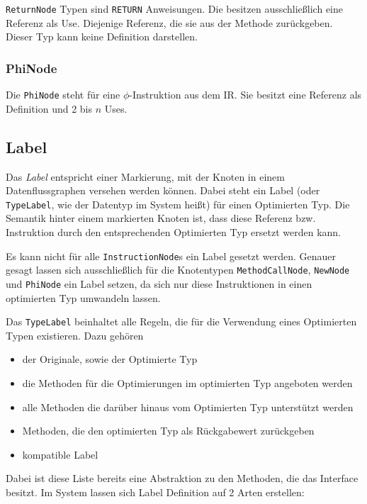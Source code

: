 \texttt{ReturnNode} Typen sind \texttt{RETURN} Anweisungen. Die besitzen 
ausschließlich eine Referenz als Use. Diejenige Referenz, die sie aus der Methode 
zurückgeben. Dieser Typ kann keine Definition darstellen.

\subsubsection{PhiNode}

Die \texttt{PhiNode} steht für eine $\phi$-Instruktion aus dem IR. Sie besitzt eine
Referenz als Definition und 2 bis $n$ Uses.

\subsection{Label}

Das \textit{Label} entspricht einer Markierung, mit der Knoten in einem 
Datenflussgraphen versehen werden können. Dabei steht ein Label (oder 
\texttt{TypeLabel}, wie der Datentyp im System heißt) für einen Optimierten Typ.
Die Semantik hinter einem markierten Knoten ist, dass diese Referenz bzw. Instruktion
durch den entsprechenden Optimierten Typ ersetzt werden kann.

Es kann nicht für alle \texttt{InstructionNode}s ein Label gesetzt werden. Genauer
gesagt lassen sich ausschließlich für die Knotentypen \texttt{MethodCallNode}, 
\texttt{NewNode} und \texttt{PhiNode} ein Label setzen, da sich nur diese 
Instruktionen in einen optimierten Typ umwandeln lassen.

Das \texttt{TypeLabel} beinhaltet alle Regeln, die für die Verwendung eines
Optimierten Typen existieren. Dazu gehören

\begin{itemize}
	\item der Originale, sowie der Optimierte Typ
	\item die Methoden für die Optimierungen im optimierten Typ angeboten werden
	\item alle Methoden die darüber hinaus vom Optimierten Typ unterstützt werden
	\item Methoden, die den optimierten Typ als Rückgabewert zurückgeben
	\item kompatible Label
\end{itemize}

Dabei ist diese Liste bereits eine Abstraktion zu den Methoden, die das Interface 
besitzt. Im System lassen sich Label Definition auf 2 Arten erstellen:

